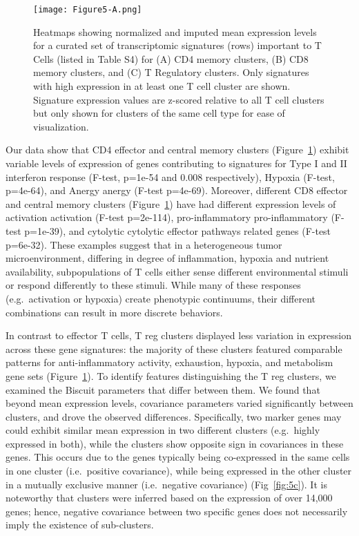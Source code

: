 \begin{figure}
\centering
\texttt{[image: Figure5-A.png]}
\caption{Heatmaps showing normalized and imputed mean expression levels for a curated set of transcriptomic signatures (rows) important to T Cells (listed in Table S4) for (A) CD4 memory clusters, (B) CD8 memory clusters, and (C) T Regulatory clusters.
  Only signatures with high expression in at least one T cell cluster are shown.
  Signature expression values are z-scored relative to all T cell clusters but only shown for clusters of the same cell type for ease of visualization.
}
\label{fig:5a}
\end{figure}

Our data show that CD4 effector and central memory clusters (Figure~\ref{fig:5a}) exhibit variable levels of expression of genes contributing to signatures for Type I and II interferon response (F-test, p=1e-54 and 0.008 respectively), Hypoxia (F-test, p=4e-64), and Anergy anergy (F-test p=4e-69).
Moreover, different CD8 effector and central memory clusters (Figure~\ref{fig:5a}) have had different expression levels of activation activation (F-test p=2e-114), pro-inflammatory pro-inflammatory (F-test p=1e-39), and cytolytic cytolytic effector pathways related genes (F-test p=6e-32).
These examples suggest that in a heterogeneous tumor microenvironment, differing in degree of inflammation, hypoxia and nutrient availability, subpopulations of T cells either sense different environmental stimuli or respond differently to these stimuli.
While many of these responses (e.g.\ activation or hypoxia) create phenotypic continuums, their different combinations can result in more discrete behaviors.

In contrast to effector T cells, T reg clusters displayed less variation in expression across these gene signatures: the majority of these clusters featured comparable patterns for anti-inflammatory activity, exhaustion, hypoxia, and metabolism gene sets (Figure~\ref{fig:5a}).
To identify features distinguishing the T reg clusters, we examined the Biscuit parameters that differ between them.
We found that beyond mean expression levels, covariance parameters varied significantly between clusters, and drove the observed differences.
Specifically, two marker genes may could exhibit similar mean expression in two different clusters (e.g.\ highly expressed in both), while the clusters show opposite sign in covariances in these genes.
This occurs due to the genes typically being co-expressed in the same cells in one cluster (i.e.\ positive covariance), while being expressed in the other cluster in a mutually exclusive manner (i.e.\ negative covariance) (Fig~\ref{fig:5c}).
It is noteworthy that clusters were inferred based on the expression of over 14,000 genes; hence, negative covariance between two specific genes does not necessarily imply the existence of sub-clusters.

